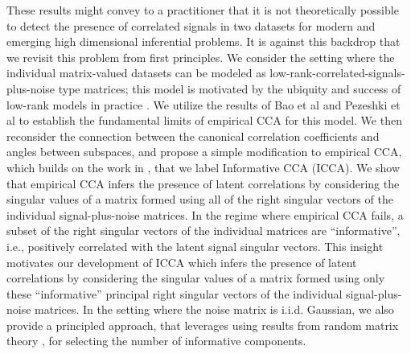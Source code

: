 These results might convey to a practitioner that it is not theoretically possible to
detect the presence of correlated signals in two datasets for modern and emerging high
dimensional inferential problems. It is against this backdrop that we revisit this problem
from first principles. We consider the setting where the individual matrix-valued datasets
can be modeled as low-rank-correlated-signals-plus-noise type matrices; this model is
motivated by the ubiquity and success of low-rank models in practice
\cite{eckart1936approximation,candes2011robust,belkin2003laplacian,bach2003kernel,candes2011tight}. We
utilize the results of Bao et al \cite{bao2014canonical} and Pezeshki et al
\cite{pezeshki2004empirical} to establish the fundamental limits of empirical CCA for this
model. We then reconsider the connection between the canonical correlation coefficients
and angles between subspaces, and propose a simple modification to empirical CCA, which
builds on the work in \cite{nadakuditi2011fundamental}, that we label Informative CCA
(ICCA). We show that empirical CCA infers the presence of latent correlations by
considering the singular values of a matrix formed using all of the right singular vectors
of the individual signal-plus-noise matrices. In the regime where empirical CCA fails, a
subset of the right singular vectors of the individual matrices are ``informative'', i.e.,
positively correlated with the latent signal singular vectors. This insight motivates our
development of ICCA which infers the presence of latent correlations by considering the
singular values of a matrix formed using only these ``informative'' principal right
singular vectors of the individual signal-plus-noise matrices. In the setting where the
noise matrix is i.i.d. Gaussian, we also provide a principled approach, that leverages
using results from random matrix theory \cite{nadakuditi2010fundamental}, for selecting
the number of informative components.

